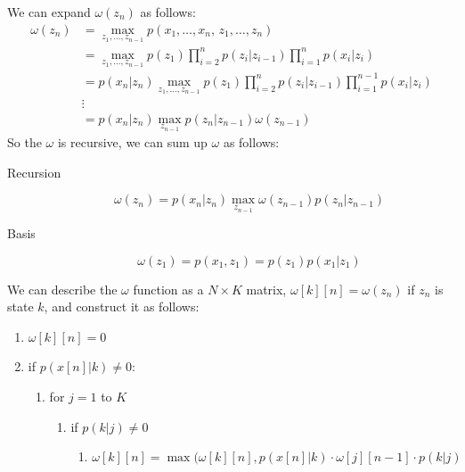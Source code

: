     We can expand $\omega(z_n)$ as follows:
    \begin{align*}
        \omega(z_n)&=\max_{z_1,\dots,z_{n-1}}p(x_1,\dots,x_n,\,z_1,\dots,z_n)\\
            &=\max_{z_1,\dots,z_{n-1}} p(z_1) \prod_{i=2}^n p(z_i|z_{i-1}) 
            \prod_{i=1}^{n}p(x_i|z_i)\\
            &=p(x_n|z_n)\max_{z_1,\dots,z_{n-1}} 
            p(z_1)\prod_{i=2}^{n}p(z_i|z_{i-1}) \prod_{i=1}^{n-1}p(x_i|z_i)\\
            &\vdots\\
            &=p(x_n|z_n) \max_{z_{n-1}} p(z_n|z_{n-1})\omega(z_{n-1})
    \end{align*}
    So the $\omega$ is recursive, we can sum up $\omega$ as follows:
    \begin{description}
        \item[Recursion]
        \begin{equation*}
            \omega(z_n)=p(x_n|z_n) \max_{z_{n-1}} \omega(z_{n-1})p(z_n|z_{n-1})
        \end{equation*}
        \item[Basis]
        \begin{equation*}
            \omega(z_1)=p(x_1,z_1)=p(z_1)p(x_1|z_1)
        \end{equation*}
    \end{description}
    We can describe the $\omega$ function as a $N\times K$ matrix, 
    $\omega[k][n]=\omega(z_n)$ if $z_n$ is state $k$, and construct it as 
    follows:
    \begin{enumerate}
        \item $\omega[k][n] = 0$
        \item if $p(x[n]|k) \neq 0:$
        \begin{enumerate}
            \item for $j=1$ to $K$
            \begin{enumerate}
                \item if $p(k|j) \neq 0$
                \begin{enumerate}
                    \item $\omega[k][n]=\max(\omega[k][n], p(x[n]|k) \cdot 
                    \omega[j][n-1] \cdot p(k|j)$
                \end{enumerate}
            \end{enumerate}
        \end{enumerate}
    \end{enumerate}
